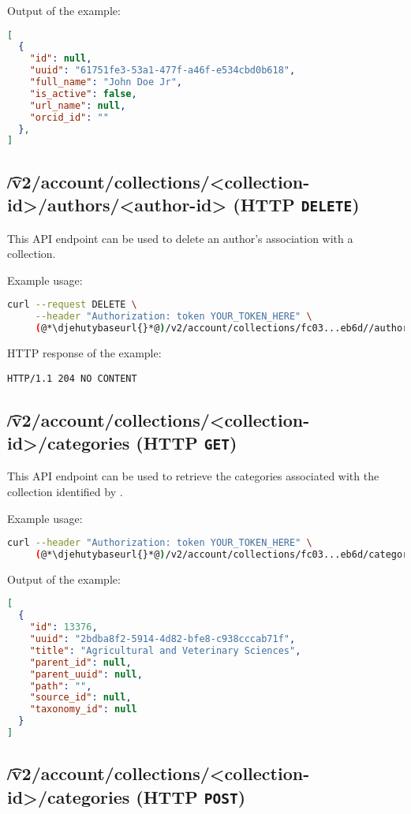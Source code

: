   Output of the example:
\begin{lstlisting}[language=JSON]
[
  {
    "id": null,
    "uuid": "61751fe3-53a1-477f-a46f-e534cbd0b618",
    "full_name": "John Doe Jr",
    "is_active": false,
    "url_name": null,
    "orcid_id": ""
  },
]
\end{lstlisting}

\subsection{\t{/v2/account/collections/<collection-id>/authors/<author-id>} (HTTP \texttt{DELETE})}

  This API endpoint can be used to delete an author's association with a collection.

  Example usage:
\begin{lstlisting}[language=bash]
curl --request DELETE \
     --header "Authorization: token YOUR_TOKEN_HERE" \
     (@*\djehutybaseurl{}*@)/v2/account/collections/fc03...eb6d//authors/5c75...94aa
\end{lstlisting}

  HTTP response of the example:
\begin{lstlisting}
HTTP/1.1 204 NO CONTENT
\end{lstlisting}

\subsection{\t{/v2/account/collections/<collection-id>/categories} (HTTP \texttt{GET})}

  This API endpoint can be used to retrieve the categories associated with
  the collection identified by .

  Example usage:
\begin{lstlisting}[language=bash]
curl --header "Authorization: token YOUR_TOKEN_HERE" \
     (@*\djehutybaseurl{}*@)/v2/account/collections/fc03...eb6d/categories | jq
\end{lstlisting}

  Output of the example:
\begin{lstlisting}[language=JSON]
[
  {
    "id": 13376,
    "uuid": "2bdba8f2-5914-4d82-bfe8-c938cccab71f",
    "title": "Agricultural and Veterinary Sciences",
    "parent_id": null,
    "parent_uuid": null,
    "path": "",
    "source_id": null,
    "taxonomy_id": null
  }
]
\end{lstlisting}

\subsection{\t{/v2/account/collections/<collection-id>/categories} (HTTP \texttt{POST})}
\label{sec:api-v2-collections-categories-post}

